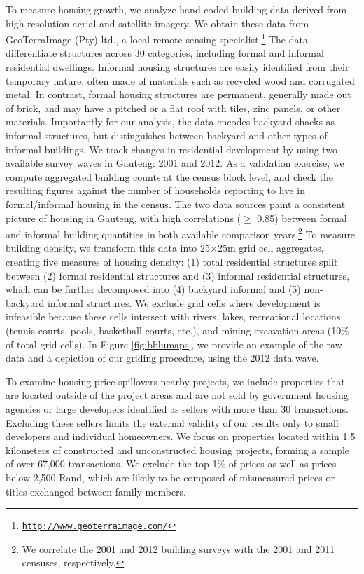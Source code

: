 \documentclass[12pt]{article}
\begin{document}
To measure housing growth, we analyze hand-coded building data derived from high-resolution aerial and satellite imagery. We obtain these data from GeoTerraImage (Pty) ltd., a local remote-sensing specialist.\footnote{\href{http://www.geoterraimage.com/}{\tt http://www.geoterraimage.com/}} The data differentiate structures across 30 categories, including formal and informal residential dwellings. Informal housing structures are easily identified from their temporary nature, often made of materials such as recycled wood and corrugated metal. In contrast, formal housing structures are permanent, generally made out of brick, and may have a pitched or a flat roof with tiles, zinc panels, or other materials. Importantly for our analysis, the data encodes backyard shacks as informal structures, but distinguishes between backyard and other types of informal buildings. We track changes in residential development by using two available survey waves in Gauteng: 2001 and 2012. As a validation exercise, we compute aggregated building counts at the census block level, and check the resulting figures against the number of households reporting to live in formal/informal housing in the census. The two data sources paint a consistent picture of housing in Gauteng, with high correlations ($\geq$ 0.85) between formal and informal building quantities in both available comparison years.\footnote{We correlate the 2001 and 2012 building surveys with the 2001 and 2011 censuses, respectively.}  To measure building density, we transform this data into 25$\times$25m grid cell aggregates, creating five measures of housing density: (1) total residential structures split between (2) formal residential structures and (3) informal residential structures, which can be further decomposed into (4) backyard informal and (5) non-backyard informal structures.  We exclude grid cells where development is infeasible because these cells intersect with rivers, lakes, recreational locations (tennis courts, pools, basketball courts, etc.), and mining excavation areas (10\% of total grid cells).  In Figure \ref{fig:bblumaps}, we provide an example of the raw data and a depiction of our griding procedure, using the 2012 data wave.


To examine housing price spillovers nearby projects, we include properties that are located outside of the project areas and are not sold by government housing agencies or large developers identified as sellers with more than 30 transactions.  Excluding these sellers limits the external validity of our results only to small developers and individual homeowners.  We focus on properties located within 1.5 kilometers of constructed and unconstructed housing projects, forming a sample of over 67,000 transactions.  We exclude the top 1\% of prices as well as prices below 2,500 Rand, which are likely to be composed of mismeasured prices or titles exchanged between family members. 
\end{document}
